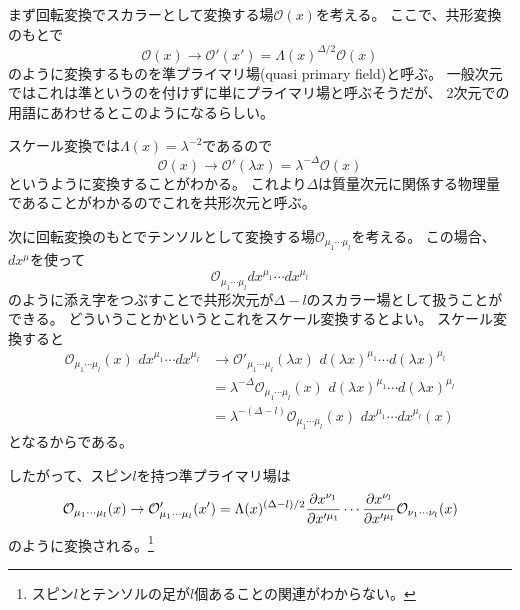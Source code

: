 \documentclass[../../master.tex]{subfiles}
\begin{document}
まず回転変換でスカラーとして変換する場\(\mathcal{O}(x)\)を考える。%
ここで、共形変換のもとで
\begin{equation}
    \mathcal{O}(x)\rightarrow\mathcal{O}'(x') = \Lambda(x)^{\Delta/2}\mathcal{O}(x)
\end{equation}
のように変換するものを準プライマリ場(quasi primary field)と呼ぶ。
一般次元ではこれは準というのを付けずに単にプライマリ場と呼ぶそうだが、
2次元での用語にあわせるとこのようになるらしい。

スケール変換では\(\Lambda(x)=\lambda^{-2}\)であるので
\begin{equation}
    \mathcal{O}(x)\rightarrow\mathcal{O}'(\lambda x) = \lambda^{-\Delta}\mathcal{O}(x)
\end{equation}
というように変換することがわかる。
これより\(\Delta\)は質量次元に関係する物理量であることがわかるのでこれを共形次元と呼ぶ。

次に回転変換のもとでテンソルとして変換する場\(\mathcal{O}_{\mu_1\cdots\mu_l}\)を考える。
この場合、\(dx^\mu\)を使って
\begin{equation}
    \mathcal{O}_{\mu_1\cdots\mu_l}dx^{\mu_1}\cdots dx^{\mu_l}
\end{equation}
のように添え字をつぶすことで共形次元が\(\Delta -l\)のスカラー場として扱うことができる。
どういうことかというとこれをスケール変換するとよい。
スケール変換すると
\begin{align*}
    \mathcal{O}_{\mu_1\cdots\mu_l}(x)\,\,dx^{\mu_1}\cdots dx^{\mu_l}
    &\rightarrow \mathcal{O}'_{\mu_1\cdots\mu_l}(\lambda x)\,\, d(\lambda x)^{\mu_1}\cdots d(\lambda x)^{\mu_l}\\
    &= \lambda^{-\Delta} \mathcal{O}_{\mu_1\cdots\mu_l}(x)\,\,d(\lambda x)^{\mu_1}\cdots d(\lambda x)^{\mu_l}\\
    &= \lambda^{-(\Delta-l)} \mathcal{O}_{\mu_1\cdots\mu_l}(x)\,\, dx^{\mu_1}\cdots dx^{\mu_l}(x)
\end{align*}
となるからである。

したがって、スピン\(l\)を持つ準プライマリ場は
\begin{equation}
    \mathcal{O}_{\mu_1\cdots\mu_l}(x)
    \rightarrow \mathcal{O}'_{\mu_1\cdots\mu_l}(x')
    =\Lambda(x)^{(\Delta-l)/2}\pdv{x^{\nu_1}}{x'^{\mu_1}}\cdots\pdv{x^{\nu_l}}{x'^{\mu_l}} \mathcal{O}_{\nu_1\cdots\nu_l}(x)
\end{equation}
のように変換される。\footnote{スピン\(l\)とテンソルの足が\(l\)個あることの関連がわからない。}%
\end{document}
